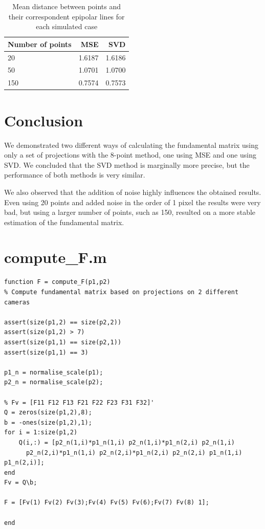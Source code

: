 \documentclass[peerreview,11pt]{IEEEtran}
\begin{document}
\begin{table}[ht]
	\caption{Mean distance between points and their correspondent epipolar lines for each simulated case}
	\centering
	\begin{tabular}{l | r r }\label{tab:ep_dist_comp}
		Number of points & MSE & SVD \\
		\hline
		20 & 1.6187 & 1.6186 \\
		50 & 1.0701 & 1.0700 \\
		150 & 0.7574 & 0.7573 \\
	\end{tabular}
\end{table}










\section{Conclusion}\label{conclusion}

We demonstrated two different ways of calculating the fundamental matrix using only a set of projections with the 8-point method, one using MSE and one using SVD. We concluded that the SVD method is marginally more precise, but the performance of both methods is very similar.

We also observed that the addition of noise highly influences the obtained results. Even using 20 points and added noise in the order of 1 pixel the results were very bad, but using a larger number of points, such as 150, resulted on a more stable estimation of the fundamental matrix.






\appendices

\newpage
\section{compute\_F.m}\label{computeF}

\begin{verbatim}
function F = compute_F(p1,p2)
% Compute fundamental matrix based on projections on 2 different cameras

assert(size(p1,2) == size(p2,2))
assert(size(p1,2) > 7)
assert(size(p1,1) == size(p2,1))
assert(size(p1,1) == 3)

p1_n = normalise_scale(p1);
p2_n = normalise_scale(p2);

% Fv = [F11 F12 F13 F21 F22 F23 F31 F32]'
Q = zeros(size(p1,2),8);
b = -ones(size(p1,2),1);
for i = 1:size(p1,2)
    Q(i,:) = [p2_n(1,i)*p1_n(1,i) p2_n(1,i)*p1_n(2,i) p2_n(1,i) 
      p2_n(2,i)*p1_n(1,i) p2_n(2,i)*p1_n(2,i) p2_n(2,i) p1_n(1,i) p1_n(2,i)];
end
Fv = Q\b;

F = [Fv(1) Fv(2) Fv(3);Fv(4) Fv(5) Fv(6);Fv(7) Fv(8) 1];

end
\end{verbatim}
\end{document}
